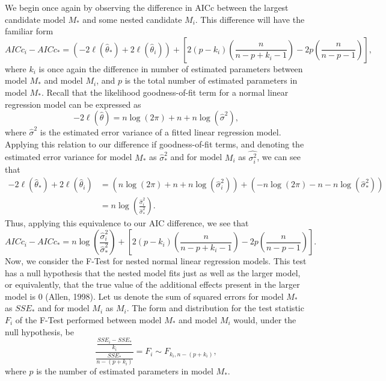 We begin once again by observing the difference in AICc between the largest candidate model $M_*$ and some nested candidate $M_i$. This difference
will have the familiar form
\begin{equation}
	AICc_i - AICc_* = \left( -2 \ell (\hat{\theta}_*) + 2 \ell (\hat{\theta}_i) \right) + \left[ 2(p-k_i) \left( \frac{n}{n-p+k_i-1} \right) - 2p \left( \frac{n}{n-p-1} \right) \right] ,
\end{equation}
where $k_i$ is once again the difference in number of estimated parameters between model $M_*$ and model $M_i$, and $p$ is the total number of
estimated parameters in model $M_*$. Recall that the likelihood goodness-of-fit term for a normal linear regression model can be expressed as
\begin{equation}
	-2 \ell (\hat{\theta}) = n \log(2 \pi) + n + n \log(\hat{\sigma} ^2 ) ,
\end{equation}
where $\hat{\sigma} ^2$ is the estimated error variance of a fitted linear regression model. Applying this relation to our difference if goodness-of-fit
terms, and denoting the estimated error variance for model $M_*$ as $\hat{\sigma}_* ^2$ and for model $M_i$ as $\hat{\sigma^2_i}$, we can see that
\begin{equation}
	\begin{split}
	-2 \ell (\hat{\theta}_*) + 2 \ell (\hat{\theta}_i) & = (n\log(2\pi) + n + n\log(\hat{\sigma}^2_i)) + (-n\log(2\pi) - n - n\log(\hat{\sigma}^2_*)) \\
	& = n\log \left( \frac{\hat{\sigma}^2_i}{\hat{\sigma}^2_*} \right) .
	\end{split}
\end{equation}
Thus, applying this equivalence to our AIC difference, we see that
\begin{equation}
	AICc_i - AICc_* = n\log \left( \frac{\hat{\sigma}^2_i}{\hat{\sigma}^2_*} \right) + \left[ 2(p-k_i) \left( \frac{n}{n-p+k_i-1} \right) - 2p \left( \frac{n}{n-p-1} \right) \right] .
\end{equation}
Now, we consider the F-Test for nested normal linear regression models. This test has a null hypothesis that the nested model fits just as well as the
larger model, or equivalently, that the true value of the additional effects present in the larger model is 0 (Allen, 1998). Let us denote the sum
of squared errors for model $M_*$ as $SSE_*$ and for model $M_i$ as $M_i$. The form and distribution for the test statistic $F_i$ of the F-Test 
performed between model $M_*$ and model $M_i$ would, under the null hypothesis, be
\begin{equation}
	\frac{\frac{SSE_i - SSE_*}{k_i}}{\frac{SSE_*}{n-(p+k_i)}} = F_i \sim F_{k_i, n-(p+k_i)} ,
\end{equation}
where $p$ is the number of estimated parameters in model $M_*$.

